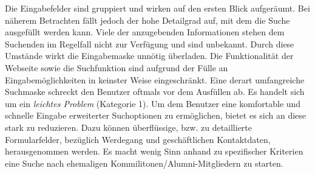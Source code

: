 {
	Die Eingabefelder sind gruppiert und wirken auf den ersten Blick aufgeräumt. Bei näherem Betrachten fällt jedoch der hohe Detailgrad auf, mit dem die Suche ausgefüllt werden kann. Viele der anzugebenden Informationen stehen dem Suchenden im Regelfall nicht zur Verfügung und sind unbekannt. Durch diese Umstände wirkt die Eingabemaske unnötig überladen.
}
{
	Die Funktionalität der Webseite sowie die Suchfunktion sind aufgrund der Fülle an Eingabemöglichkeiten in keinster Weise eingeschränkt. Eine derart umfangreiche Suchmaske schreckt den Benutzer oftmals vor dem Ausfüllen ab. Es handelt sich um ein \emph{leichtes Problem} (Kategorie 1).
}
{
	Um dem Benutzer eine komfortable und schnelle Eingabe erweiterter Suchoptionen zu ermöglichen, bietet es sich an diese stark zu reduzieren. Dazu können überflüssige, bzw. zu detaillierte Formularfelder, bezüglich Werdegang und geschäftlichen Kontaktdaten, herausgenommen werden. Es macht wenig Sinn anhand zu spezifischer Kriterien eine Suche nach ehemaligen Kommilitonen/Alumni-Mitgliedern zu starten.
}
\label{prob:suche:vieleeingabefelder}

